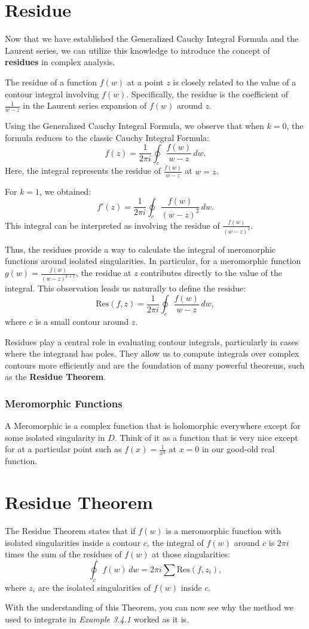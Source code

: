 \documentclass[12pt]{book}
\begin{document}
\section{Residue}

Now that we have established the Generalized Cauchy Integral Formula and the Laurent series, we can utilize this knowledge to introduce the concept of \textbf{residues} in complex analysis.

The residue of a function \(f(w)\) at a point \(z\) is closely related to the value of a contour integral involving \(f(w)\). Specifically, the residue is the coefficient of \(\frac{1}{w - z}\) in the Laurent series expansion of \(f(w)\) around \(z\).


Using the Generalized Cauchy Integral Formula, we observe that when \(k = 0\), the formula reduces to the classic Cauchy Integral Formula:
\[
f(z) = \frac{1}{2\pi i} \oint_c \frac{f(w)}{w - z} \, dw.
\]
Here, the integral represents the residue of \(\frac{f(w)}{w - z}\) at \(w = z\).

For \(k = 1\), we obtained:
\[
f'(z) = \frac{1}{2\pi i} \oint_c \frac{f(w)}{(w - z)^2} \, dw.
\]
This integral can be interpreted as involving the residue of \(\frac{f(w)}{(w - z)^2}\).

Thus, the residues provide a way to calculate the integral of meromorphic functions around isolated singularities. In particular, for a meromorphic function \(g(w) = \frac{f(w)}{(w - z)^{k+1}}\), the residue at \(z\) contributes directly to the value of the integral. This observation leads us naturally to define the residue:
\[
\text{Res}(f, z) = \frac{1}{2\pi i} \oint_c \frac{f(w)}{w - z} \, dw,
\]
where \(c\) is a small contour around \(z\).

Residues play a central role in evaluating contour integrals, particularly in cases where the integrand has poles. They allow us to compute integrals over complex contours more efficiently and are the foundation of many powerful theorems, such as the \textbf{Residue Theorem}.

\subsubsection{Meromorphic Functions}
A Meromorphic is a complex function that is holomorphic everywhere except for some isolated singularity in $D$. Think of it as a function that is very nice except for at a particular point such as $f(x) = \frac{1}{x^2}$ at $x=0$ in our good-old real function. 

\section{Residue Theorem}

The Residue Theorem states that if \(f(w)\) is a meromorphic function with isolated singularities inside a contour \(c\), the integral of \(f(w)\) around \(c\) is \(2\pi i\) times the sum of the residues of \(f(w)\) at those singularities:
\[
\oint_c f(w) \, dw = 2\pi i \sum \text{Res}(f, z_i),
\]
where \(z_i\) are the isolated singularities of \(f(w)\) inside \(c\).

With the understanding of this Theorem, you can now see why the method we used to integrate in \textit{Example 3.4.1} worked as it is. 
\end{document}
